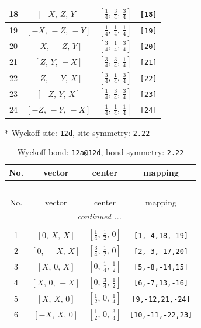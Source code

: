 \documentclass[fleqn,8pt]{jsarticle}
\begin{document}
\begin{longtable}{cccc}
18 & $\left[ - X,\, Z,\, Y \right]$ & $\left[ \frac{1}{4},\, \frac{3}{4},\, \frac{3}{4} \right]$ & {\tt [18]} \\ \hline
19 & $\left[ - X,\, - Z,\, - Y \right]$ & $\left[ \frac{1}{4},\, \frac{1}{4},\, \frac{1}{4} \right]$ & {\tt [19]} \\ \hline
20 & $\left[ X,\, - Z,\, Y \right]$ & $\left[ \frac{3}{4},\, \frac{1}{4},\, \frac{3}{4} \right]$ & {\tt [20]} \\ \hline
21 & $\left[ Z,\, Y,\, - X \right]$ & $\left[ \frac{3}{4},\, \frac{3}{4},\, \frac{1}{4} \right]$ & {\tt [21]} \\ \hline
22 & $\left[ Z,\, - Y,\, X \right]$ & $\left[ \frac{3}{4},\, \frac{1}{4},\, \frac{3}{4} \right]$ & {\tt [22]} \\ \hline
23 & $\left[ - Z,\, Y,\, X \right]$ & $\left[ \frac{1}{4},\, \frac{3}{4},\, \frac{3}{4} \right]$ & {\tt [23]} \\ \hline
24 & $\left[ - Z,\, - Y,\, - X \right]$ & $\left[ \frac{1}{4},\, \frac{1}{4},\, \frac{1}{4} \right]$ & {\tt [24]} \\
\end{longtable}
* Wyckoff site: {\tt 12d}, site symmetry: {\tt 2.22}
\renewcommand{\arraystretch}{1.2}
\begin{longtable}{cccc}
\caption{Wyckoff bond: {\tt 12a@12d}, bond symmetry: {\tt 2.22}}
 \\
 \hline \hline
No. & vector & center & mapping \\ \hline \endfirsthead

\multicolumn{3}{l}{\tablename\ \thetable{}} \\
 \hline \hline
No. & vector & center & mapping \\ \hline \endhead

 \hline \hline
\multicolumn{3}{r}{\footnotesize\it continued ...} \\ \endfoot

 \hline \hline
\multicolumn{3}{r}{} \\ \endlastfoot

1 & $\left[ 0,\, X,\, X \right]$ & $\left[ \frac{1}{4},\, \frac{1}{2},\, 0 \right]$ & {\tt [1,-4,18,-19]} \\ \hline
2 & $\left[ 0,\, - X,\, X \right]$ & $\left[ \frac{3}{4},\, \frac{1}{2},\, 0 \right]$ & {\tt [2,-3,-17,20]} \\ \hline
3 & $\left[ X,\, 0,\, X \right]$ & $\left[ 0,\, \frac{1}{4},\, \frac{1}{2} \right]$ & {\tt [5,-8,-14,15]} \\ \hline
4 & $\left[ X,\, 0,\, - X \right]$ & $\left[ 0,\, \frac{3}{4},\, \frac{1}{2} \right]$ & {\tt [6,-7,13,-16]} \\ \hline
5 & $\left[ X,\, X,\, 0 \right]$ & $\left[ \frac{1}{2},\, 0,\, \frac{1}{4} \right]$ & {\tt [9,-12,21,-24]} \\ \hline
6 & $\left[ - X,\, X,\, 0 \right]$ & $\left[ \frac{1}{2},\, 0,\, \frac{3}{4} \right]$ & {\tt [10,-11,-22,23]} \\
\end{longtable}
\end{document}
